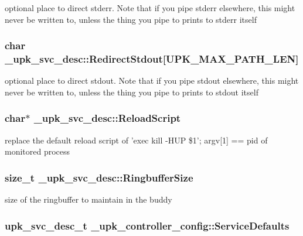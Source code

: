 optional place to direct stderr. Note that if you pipe stderr elsewhere, this might never be written to, unless the thing you pipe to prints to stderr itself 
\subsubsection{\setlength{\rightskip}{0pt plus 5cm}char \bf{\_\-upk\_\-svc\_\-desc::Redirect\-Stdout}[UPK\_\-MAX\_\-PATH\_\-LEN]\hspace{0.3cm}{\tt  [inherited]}}\label{group__config__impl_g8b6cd724a13fe0639456472d6f3a9f4b}


optional place to direct stdout. Note that if you pipe stdout elsewhere, this might never be written to, unless the thing you pipe to prints to stdout itself 
\subsubsection{\setlength{\rightskip}{0pt plus 5cm}char$\ast$ \bf{\_\-upk\_\-svc\_\-desc::Reload\-Script}\hspace{0.3cm}{\tt  [inherited]}}\label{group__config__impl_g505ee4877271be6749c1b9145b67b120}


replace the default reload script of 'exec kill -HUP \$1'; argv[1] == pid of monitored process 
\subsubsection{\setlength{\rightskip}{0pt plus 5cm}size\_\-t \bf{\_\-upk\_\-svc\_\-desc::Ringbuffer\-Size}\hspace{0.3cm}{\tt  [inherited]}}\label{group__config__impl_g50cd26c6cb63d96d54c717170f58bb4e}


size of the ringbuffer to maintain in the buddy 
\subsubsection{\setlength{\rightskip}{0pt plus 5cm}\bf{upk\_\-svc\_\-desc\_\-t} \bf{\_\-upk\_\-controller\_\-config::Service\-Defaults}\hspace{0.3cm}{\tt  [inherited]}}\label{group__config__impl_g3e8794925f2793f5740c3ba7b399149b}



